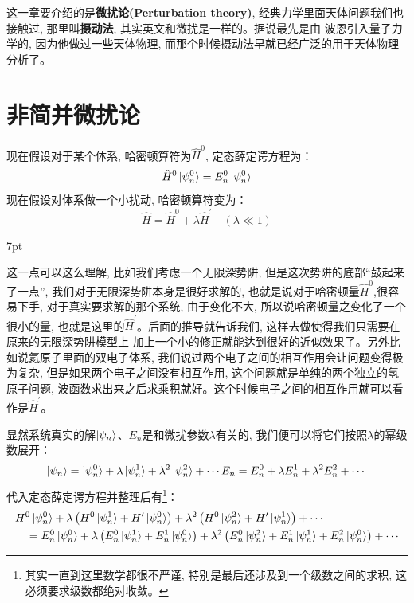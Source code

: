 \documentclass[a4paper,zihao=-4,linespread=1]{ctexrep}
\newenvironment{thinknote}{%
\def\FrameCommand{%
\hspace{1pt}%
{\color{BurlyWood}\vrule width 2pt}%
{\color{formalshade}\vrule width 4pt}%
\colorbox{formalshade}%
}%
\MakeFramed{\advance\hsize-\width\FrameRestore}%
\noindent\hspace{-4.55pt}%
\begin{adjustwidth}{}{7pt}%
\vspace{2pt}\vspace{2pt}%
}
{%
\vspace{2pt}\end{adjustwidth}\endMakeFramed%
}
\begin{document}
    这一章要介绍的是\textbf{微扰论(Perturbation theory)}, 经典力学里面天体问题我们也接触过, 那里叫\textbf{摄动法}, 其实英文和微扰是一样的。据说最先是由
    波恩引入量子力学的, 因为他做过一些天体物理, 而那个时候摄动法早就已经广泛的用于天体物理分析了。

    \section{非简并微扰论}
    现在假设对于某个体系, 哈密顿算符为$\hat{H}^0$, 定态薛定谔方程为：
    \begin{equation}
        \label{eq:7.1}
        \hat{H}^0\ket{\psi_n^0}=E_n^0\ket{\psi_n^0}
    \end{equation}
    现在假设对体系做一个小扰动, 哈密顿算符变为：
    \[\hat{H}=\hat{H}^0+\lambda\hat{H}^\prime\quad(\lambda\ll 1)\]
    \begin{thinknote}
    \setlength\parindent{2em}这一点可以这么理解, 比如我们考虑一个无限深势阱, 但是这次势阱的底部“鼓起来了一点”, 我们对于无限深势阱本身是很好求解的, 也就是说对于哈密顿量$\hat{H}^0$,很容易下手,
    对于真实要求解的那个系统, 由于变化不大, 所以说哈密顿量之变化了一个很小的量, 也就是这里的$\hat{H}^\prime$。后面的推导就告诉我们, 这样去做使得我们只需要在原来的无限深势阱模型上
    加上一个小的修正就能达到很好的近似效果了。另外比如说氦原子里面的双电子体系, 我们说过两个电子之间的相互作用会让问题变得极为复杂, 但是如果两个电子之间没有相互作用,
    这个问题就是单纯的两个独立的氢原子问题, 波函数求出来之后求乘积就好。这个时候电子之间的相互作用就可以看作是$\hat{H}^\prime$。
    \end{thinknote}

    显然系统真实的解$\ket{\psi_n}$、$E_n$是和微扰参数$\lambda$有关的, 我们便可以将它们按照$\lambda$的幂级数展开：
    \begin{equation}
        \ket{\psi_n}=\ket{\psi_n^0}+\lambda \ket{\psi_n^1}+\lambda^2\ket{\psi_n^2}+\cdots\\
        E_n=E_n^0+\lambda E_n^1+\lambda^2 E_n^2+\cdots
    \end{equation}
    代入定态薛定谔方程并整理后有\footnote{其实一直到这里数学都很不严谨, 特别是最后还涉及到一个级数之间的求积, 这必须要求级数都绝对收敛。}：
    \begin{equation}
        \label{eq:7.3}
        \begin{aligned}
            &H^0 \ket{\psi_n^0}+\lambda\left(H^0 \ket{\psi_n^1}+H^{\prime} \ket{\psi_n^0}\right)+\lambda^2\left(H^0 \ket{\psi_n^2}+H^{\prime} \ket{\psi_n^1}\right)+\cdots \\
            &\quad=E_n^0 \ket{\psi_n^0}+\lambda\left(E_n^0 \ket{\psi_n^1}+E_n^1 \ket{\psi_n^0}\right)+\lambda^2\left(E_n^0 \ket{\psi_n^2}+E_n^1 \ket{\psi_n^1}+E_n^2 \ket{\psi_n^0}\right)+\cdots
        \end{aligned}
    \end{equation}
    
\end{document}

